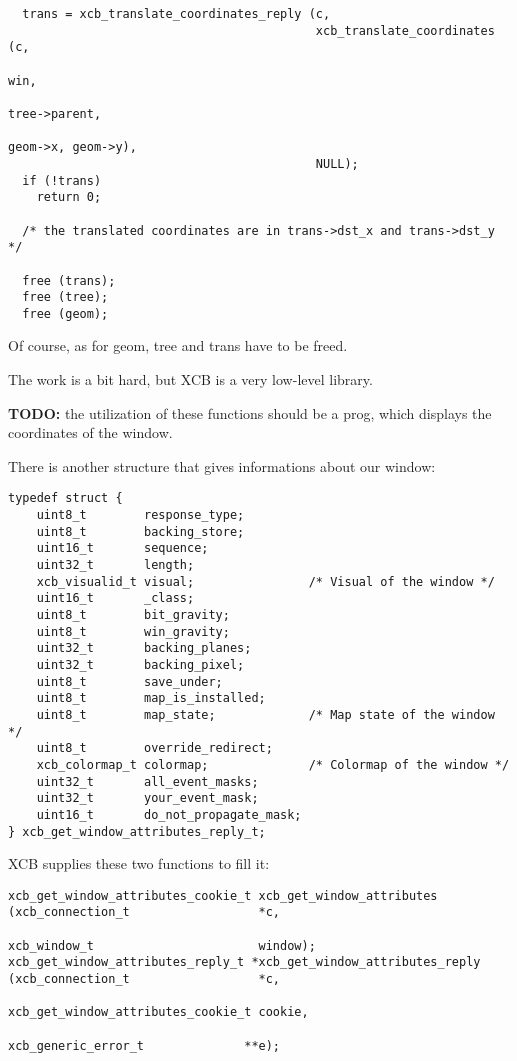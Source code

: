 \documentclass[12pt,oneside,titlepage]{book}
\begin{document}
\begin{enumerate}
\begin{enumerate}
\begin{verbatim}
  trans = xcb_translate_coordinates_reply (c,
                                           xcb_translate_coordinates (c,
                                                                      win,
                                                                      tree->parent,
                                                                      geom->x, geom->y),
                                           NULL);
  if (!trans)
    return 0;

  /* the translated coordinates are in trans->dst_x and trans->dst_y */

  free (trans);
  free (tree);
  free (geom);
\end{verbatim}

    Of course, as for {geom}, {tree} and {trans} have to be freed.

    The work is a bit hard, but XCB is a very low-level library.

    \textbf{TODO:} the utilization of these functions should be a prog,
    which displays the coordinates of the window.

    There is another structure that gives informations about our window:

\begin{verbatim}
typedef struct {
    uint8_t        response_type;
    uint8_t        backing_store;
    uint16_t       sequence;
    uint32_t       length;
    xcb_visualid_t visual;                /* Visual of the window */
    uint16_t       _class;
    uint8_t        bit_gravity;
    uint8_t        win_gravity;
    uint32_t       backing_planes;
    uint32_t       backing_pixel;
    uint8_t        save_under;
    uint8_t        map_is_installed;
    uint8_t        map_state;             /* Map state of the window */
    uint8_t        override_redirect;
    xcb_colormap_t colormap;              /* Colormap of the window */
    uint32_t       all_event_masks;
    uint32_t       your_event_mask;
    uint16_t       do_not_propagate_mask;
} xcb_get_window_attributes_reply_t;
\end{verbatim}

    XCB supplies these two functions to fill it:

\begin{verbatim}
xcb_get_window_attributes_cookie_t xcb_get_window_attributes       (xcb_connection_t                  *c,
                                                                    xcb_window_t                       window);
xcb_get_window_attributes_reply_t *xcb_get_window_attributes_reply (xcb_connection_t                  *c,
                                                                    xcb_get_window_attributes_cookie_t cookie,
                                                                    xcb_generic_error_t              **e);
\end{verbatim}


\end{enumerate}
\end{enumerate}
\end{document}
